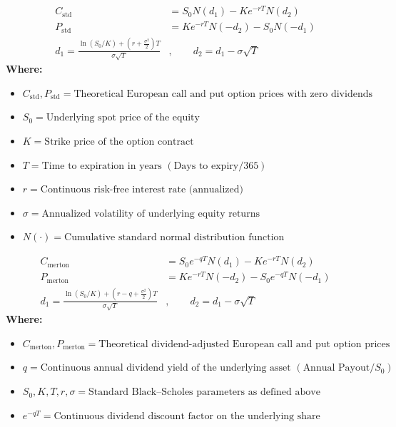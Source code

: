 \begin{formulabox}[Standard Black--Scholes European Option Formulas ($q = 0$)]
\begin{align*}
C_{\text{std}} &= S_0 N(d_1) - K e^{-r T} N(d_2) \\
P_{\text{std}} &= K e^{-r T} N(-d_2) - S_0 N(-d_1) \\
d_1 = \frac{\ln(S_0 / K) + \left(r + \frac{\sigma^2}{2}\right)T}{\sigma \sqrt{T}}&, \qquad d_2 = d_1 - \sigma \sqrt{T}
\end{align*}
\textbf{Where:}
\begin{itemize}[leftmargin=1.8em, noitemsep]
    \item $C_{\text{std}}, P_{\text{std}} = \text{Theoretical European call and put option prices with zero dividends}$
    \item $S_0 = \text{Underlying spot price of the equity}$
    \item $K = \text{Strike price of the option contract}$
    \item $T = \text{Time to expiration in years } (\text{Days to expiry} / 365)$
    \item $r = \text{Continuous risk-free interest rate (annualized)}$
    \item $\sigma = \text{Annualized volatility of underlying equity returns}$
    \item $N(\cdot) = \text{Cumulative standard normal distribution function}$
\end{itemize}
\end{formulabox}

\begin{formulabox}
\begin{align*}
C_{\text{merton}} &= S_0 e^{-q T} N(d_1) - K e^{-r T} N(d_2) \\
P_{\text{merton}} &= K e^{-r T} N(-d_2) - S_0 e^{-q T} N(-d_1) \\
d_1 = \frac{\ln(S_0 / K) + \left(r - q + \frac{\sigma^2}{2}\right)T}{\sigma \sqrt{T}}&, \qquad d_2 = d_1 - \sigma \sqrt{T}
\end{align*}
\textbf{Where:}
\begin{itemize}[leftmargin=1.8em, noitemsep]
    \item $C_{\text{merton}}, P_{\text{merton}} = \text{Theoretical dividend-adjusted European call and put option prices}$
    \item $q = \text{Continuous annual dividend yield of the underlying asset } (\text{Annual Payout} / S_0)$
    \item $S_0, K, T, r, \sigma = \text{Standard Black--Scholes parameters as defined above}$
    \item $e^{-q T} = \text{Continuous dividend discount factor on the underlying share}$
\end{itemize}
\end{formulabox}

